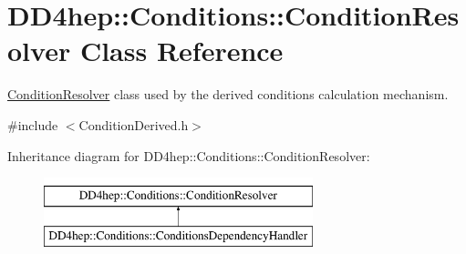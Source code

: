 \hypertarget{class_d_d4hep_1_1_conditions_1_1_condition_resolver}{}\section{D\+D4hep\+:\+:Conditions\+:\+:Condition\+Resolver Class Reference}
\label{class_d_d4hep_1_1_conditions_1_1_condition_resolver}


\hyperlink{class_d_d4hep_1_1_conditions_1_1_condition_resolver}{Condition\+Resolver} class used by the derived conditions calculation mechanism.  




{\ttfamily \#include $<$Condition\+Derived.\+h$>$}

Inheritance diagram for D\+D4hep\+:\+:Conditions\+:\+:Condition\+Resolver\+:\begin{figure}[H]
\begin{center}
\leavevmode
\includegraphics[height=2.000000cm]{class_d_d4hep_1_1_conditions_1_1_condition_resolver}
\end{center}
\end{figure}
